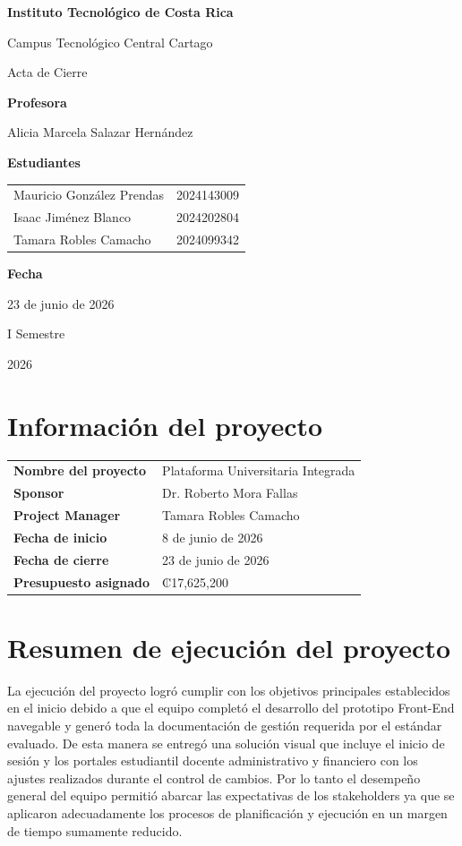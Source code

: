 \documentclass[11pt,spanish]{article}
\title{\DocumentoTitulo}
\author{\AutoresPortada}
\date{\FechaDocumento}
\makeatletter
\newcommand{\Institucion}{Instituto Tecnológico de Costa Rica}
\newcommand{\Campus}{Campus Tecnológico Central Cartago}
\newcommand{\DocumentoTitulo}{Acta de Cierre}
\newcommand{\Profesor}{Alicia Marcela Salazar Hernández}
\newcommand{\FechaDocumento}{23 de junio de 2026}
\newcommand{\PeriodoAcademico}{I Semestre}
\newcommand{\AnioDocumento}{2026}
\newcommand{\AutoresPortada}{%
    \begin{tabular}{l@{\hspace{1.5cm}}r}
        Mauricio González Prendas & 2024143009\\
        Isaac Jiménez Blanco & 2024202804\\
        Tamara Robles Camacho & 2024099342
    \end{tabular}%
}
\newcommand{\MakeCover}{%
\begin{titlepage}
\thispagestyle{empty}
\centering

{\bfseries \huge \Institucion \par}
\vspace{0.25cm}
{\LARGE \Campus \par}

\vfill

{\huge \DocumentoTitulo \par}

\vfill

{\bfseries \LARGE Profesora \par}
{\Large \Profesor \par}

\vfill

{\bfseries \LARGE Estudiantes \par}
{\Large \AutoresPortada \par}

\vfill

{\bfseries\LARGE Fecha \par}
{\Large \FechaDocumento \par}

\vfill

{\LARGE \PeriodoAcademico \par}
{\LARGE \AnioDocumento \par}

\end{titlepage}%
}
\makeatother
\begin{document}
\hypersetup{pageanchor=false}

\MakeCover

\pagestyle{empty}
\tableofcontents
\clearpage
{}
\hypersetup{pageanchor=true}
\pagestyle{fancy}

\section{Información del proyecto}

\begin{table}[H]
\centering
\begin{tabularx}{\textwidth}{p{5cm} Y}
\toprule
\textbf{Nombre del proyecto} & Plataforma Universitaria Integrada \\
\textbf{Sponsor} & Dr. Roberto Mora Fallas \\
\textbf{Project Manager} & Tamara Robles Camacho \\
\textbf{Fecha de inicio} & 8 de junio de 2026 \\
\textbf{Fecha de cierre} & 23 de junio de 2026 \\
\textbf{Presupuesto asignado} & ₡17,625,200 \\
\bottomrule
\end{tabularx}
\end{table}

\section{Resumen de ejecución del proyecto}

La ejecución del proyecto logró cumplir con los objetivos principales establecidos en el inicio debido a que el equipo completó el desarrollo del prototipo Front-End navegable y generó toda la documentación de gestión requerida por el estándar evaluado. De esta manera se entregó una solución visual que incluye el inicio de sesión y los portales estudiantil docente administrativo y financiero con los ajustes realizados durante el control de cambios. Por lo tanto el desempeño general del equipo permitió abarcar las expectativas de los stakeholders ya que se aplicaron adecuadamente los procesos de planificación y ejecución en un margen de tiempo sumamente reducido.
\end{document}
